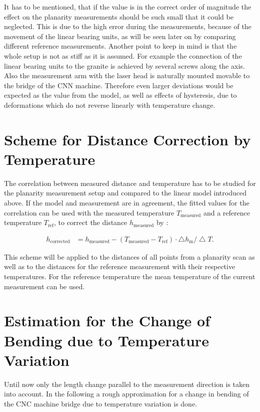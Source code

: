 \documentclass[
a4paper,                                %
twoside,                                %
BCOR1.4cm,                      %
10pt,                           %
headings=normal,                %
headsepline,                    %
clearplainpage, %
final,                                  %
div=14,
parskip=full,
openright,
bibliography=toc
]{scrreprt}
\begin{document}
It has to be mentioned, that if the value is in the correct order of magnitude the effect on the planarity measurements should be such small that it could be neglected. This is due to the high error during the measurements, because of the movement of the linear bearing units, as will be seen later on by comparing different reference measurements. Another point to keep in mind is that the whole setup is not as stiff as it is assumed. For example the connection of the linear bearing units to the granite is achieved by several screws along the axis. Also the measurement arm with the laser head is naturally mounted movable to the bridge of the CNN machine. Therefore even larger deviations would be expected as the value from the model, as well as effects of hysteresis, due to deformations which do not reverse linearly with temperature change. 

\section{Scheme for Distance Correction by Temperature}

The correlation between measured distance and temperature has to be studied for the planarity measurement setup and compared to the linear model introduced above. If the model and measurement are in agreement, the fitted values for the correlation can be used with the measured temperature $ T_{\mathrm{measured}} $ and a reference temperature $ T_{\mathrm{ref}} $, to correct the distance $ h_{\mathrm{measured}} $ by : 

\begin{align}
	h_{\mathrm{corrected}} &= h_{\mathrm{measured}} - \left( T_{\mathrm{measured}} - T_{\mathrm{ref}} \right) \cdot \bigtriangleup h_{\mathrm{m}} /\!\bigtriangleup\!T.
	\label{tempcorformula}
\end{align}

This scheme will be applied to the distances of all points from a planarity scan as well as to the distances for the reference measurement with their respective temperatures. For the reference temperature the mean temperature of the current measurement can be used.

\section{Estimation for the Change of Bending due to Temperature Variation}\label{estbend}

Until now only the length change parallel to the measurement direction is taken into account. In the following a rough approximation for a change in bending of the CNC machine bridge due to temperature variation is done. 
\end{document}
